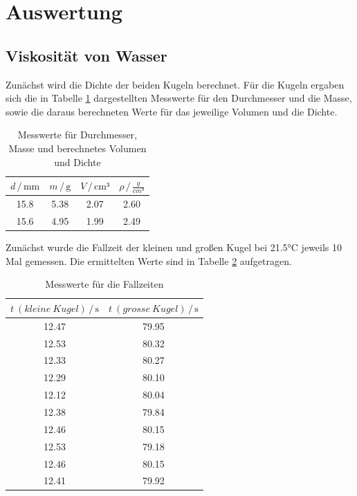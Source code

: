 \section{Auswertung}
\label{sec:Auswertung}

\subsection{Viskosität von Wasser}

Zunächst wird die Dichte der beiden Kugeln berechnet. Für die Kugeln 
ergaben sich die in Tabelle \ref{tab:Dichte} dargestellten Messwerte für den 
Durchmesser und die Masse, sowie die daraus berechneten Werte für das 
jeweilige Volumen und die Dichte.

\begin{table}
\centering
\caption{Messwerte für Durchmesser, Masse und berechnetes Volumen und Dichte}
\label{tab:Dichte}
\begin{tabular}{c c c c}
\toprule
$d \,/\, \si{\milli\meter}$ & $m \,/\, \si{\gram}$ & $V \,/\, \si{\cm³}$ & $\rho \,/\, \si{\frac{g}{cm³}}$\\
\midrule
15.8 &  5.38 & 2.07 & 2.60\\
15.6 &  4.95 & 1.99 & 2.49\\
\bottomrule
\end{tabular}
\end{table}

Zunächst wurde die Fallzeit der kleinen und großen Kugel bei 21.5°C 
jeweils 10 Mal gemessen. 
Die ermittelten Werte sind in Tabelle \ref{tab:Zeit} aufgetragen. 

\begin{table}
\centering
\caption{Messwerte für die Fallzeiten}
\label{tab:Zeit}
\begin{tabular}{c c}
\toprule
$t\: (kleine\: Kugel)\,/\, \si{\second}$ & $t\: (grosse\: Kugel) \,/\, \si{\second}$\\
\midrule
12.47 & 79.95\\
12.53 & 80.32\\
12.33 & 80.27\\
12.29 & 80.10\\
12.12 & 80.04\\
12.38 & 79.84\\
12.46 & 80.15\\
12.53 & 79.18\\
12.46 & 80.15\\
12.41 & 79.92\\
\bottomrule
\end{tabular}
\end{table}

